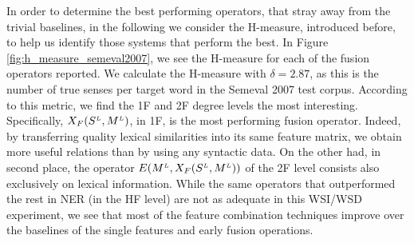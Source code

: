 In order to determine the best performing operators, that stray away from the trivial baselines, in the following we consider the H-measure, introduced before, to help us identify those systems that perform the best. In Figure \ref{fig:h_measure_semeval2007}, we see the H-measure for each of the fusion operators reported. We calculate the H-measure with $\delta=2.87$, as this is the number of true senses per target word in the Semeval 2007 test corpus.  According to this metric, we find the 1F and 2F degree  levels the most interesting. Specifically, $X_F(S^{\scriptscriptstyle L},M^{\scriptscriptstyle L})$, in 1F, is the most performing fusion operator. Indeed, by transferring quality lexical similarities into its same feature matrix, we obtain more useful relations than by using any syntactic data.
On the other had, in second place, the operator $E(M^{\scriptscriptstyle L},X_F(S^{\scriptscriptstyle L},M^{\scriptscriptstyle L}))$ of the 2F level consists also exclusively on lexical information. While the same operators that outperformed the rest in NER (in the HF level) are not as adequate in this WSI/WSD experiment, we see that most of the feature combination techniques improve over the baselines of the single features and early fusion operations. 


